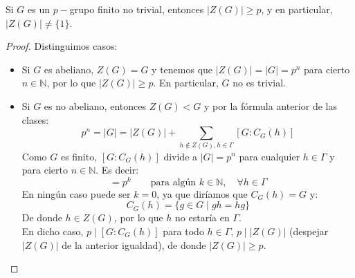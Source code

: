\begin{teo}[de Burnside]
    Si $G$ es un $p-$grupo finito no trivial, entonces \newline $|Z(G)| \geq p$, y en particular, $|Z(G)| \neq \{1\}$.
    \begin{proof}
        Distinguimos casos:
        \begin{itemize}
            \item Si $G$ es abeliano, $Z(G) = G$ y tenemos que $|Z(G)| = |G| = p^n$ para cierto $n\in \mathbb{N}$, por lo que $|Z(G)| \geq p$. En particular, $G$ no es trivial.
            \item Si $G$ es no abeliano, entonces $Z(G) < G$ y por la fórmula anterior de las clases:
                \begin{equation*}
                    p^n = |G| = |Z(G)| + \sum_{h\notin Z(G), h\in \Gamma} [G:C_G(h)]
                \end{equation*}
                Como $G$ es finito, $[G:C_G(h)]$ divide a $|G| = p^n$ para cualquier $h\in \Gamma$ y para cierto $n\in \mathbb{N}$. Es decir:
                \begin{equation*}
                    [G:C_G(h)] = p^k \qquad \text{para algún\ } k\in \mathbb{N}, \quad \forall h\in \Gamma
                \end{equation*}
                En ningún caso puede ser $k = 0$, ya que diríamos que $C_G(h) = G$ y:
                \begin{equation*}
                    C_G(h) = \{g\in G \mid gh=hg\}
                \end{equation*}
                De donde $h\in Z(G)$, por lo que $h$ no estaría en $\Gamma$.\\

                \noindent
                En dicho caso, $p\mid [G:C_G(h)]$ para todo $h\in \Gamma$, $p\mid |Z(G)|$ (despejar $|Z(G)|$ de la anterior igualdad), de donde $|Z(G)| \geq p$.
        \end{itemize}
    \end{proof}
\end{teo}

